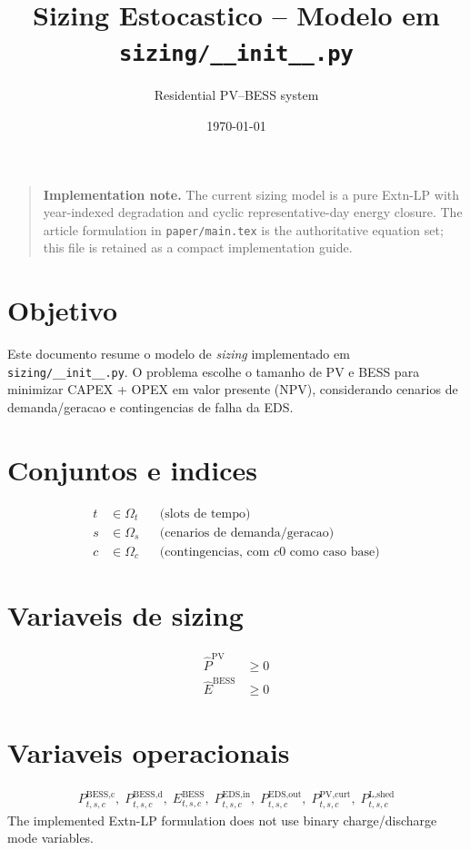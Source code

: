 \documentclass[11pt,a4paper]{article}
\title{Sizing Estocastico -- Modelo em \texttt{sizing/\_\_init\_\_.py}}
\author{Residential PV--BESS system}
\date{\today}
\begin{document}
\maketitle

\begin{quote}
\textbf{Implementation note.} The current sizing model is a pure Extn-LP with
year-indexed degradation and cyclic representative-day energy closure. The
article formulation in \texttt{paper/main.tex} is the authoritative equation
set; this file is retained as a compact implementation guide.
\end{quote}

\section{Objetivo}
Este documento resume o modelo de \emph{sizing} implementado em
\texttt{sizing/\_\_init\_\_.py}. O problema escolhe o tamanho de PV e BESS
para minimizar CAPEX + OPEX em valor presente (NPV), considerando cenarios
de demanda/geracao e contingencias de falha da EDS.

\section{Conjuntos e indices}
\begin{align}
t &\in \Omega_t && \text{(slots de tempo)}\\
s &\in \Omega_s && \text{(cenarios de demanda/geracao)}\\
c &\in \Omega_c && \text{(contingencias, com } c0 \text{ como caso base)}
\end{align}

\section{Variaveis de sizing}
\begin{align}
\hat{P}^{\text{PV}} &\ge 0 \\
\hat{E}^{\text{BESS}} &\ge 0
\end{align}

\section{Variaveis operacionais}
\begin{align}
P_{t,s,c}^{\text{BESS,c}},\;
P_{t,s,c}^{\text{BESS,d}},\;
E_{t,s,c}^{\text{BESS}},\;
P_{t,s,c}^{\text{EDS,in}},\;
P_{t,s,c}^{\text{EDS,out}},\;
P_{t,s,c}^{\text{PV,curt}},\;
P_{t,s,c}^{\text{L,shed}}
\end{align}
The implemented Extn-LP formulation does not use binary charge/discharge mode
variables.
\end{document}

